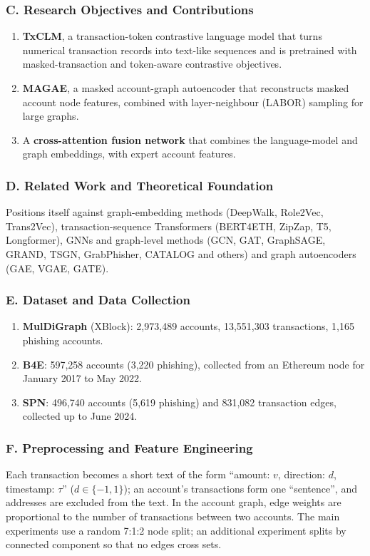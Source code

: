 \documentclass[11pt,a4paper]{article}
\begin{document}
\subsubsection*{C. Research Objectives and Contributions}
\begin{enumerate}[leftmargin=*]
    \item \textbf{TxCLM}, a transaction-token contrastive language model that turns numerical transaction records into text-like sequences and is pretrained with masked-transaction and token-aware contrastive objectives.
    \item \textbf{MAGAE}, a masked account-graph autoencoder that reconstructs masked account node features, combined with layer-neighbour (LABOR) sampling for large graphs.
    \item A \textbf{cross-attention fusion network} that combines the language-model and graph embeddings, with expert account features.
\end{enumerate}

\subsubsection*{D. Related Work and Theoretical Foundation}
Positions itself against graph-embedding methods (DeepWalk, Role2Vec, Trans2Vec), transaction-sequence Transformers (BERT4ETH, ZipZap, T5, Longformer), GNNs and graph-level methods (GCN, GAT, GraphSAGE, GRAND, TSGN, GrabPhisher, CATALOG and others) and graph autoencoders (GAE, VGAE, GATE).

\subsubsection*{E. Dataset and Data Collection}
\begin{enumerate}[leftmargin=*]
    \item \textbf{MulDiGraph} (XBlock): 2,973,489 accounts, 13,551,303 transactions, 1,165 phishing accounts.
    \item \textbf{B4E}: 597,258 accounts (3,220 phishing), collected from an Ethereum node for January 2017 to May 2022.
    \item \textbf{SPN}: 496,740 accounts (5,619 phishing) and 831,082 transaction edges, collected up to June 2024.
\end{enumerate}

\subsubsection*{F. Preprocessing and Feature Engineering}
Each transaction becomes a short text of the form ``amount: $v$, direction: $d$, timestamp: $\tau$'' ($d\in\{-1,1\}$); an account's transactions form one ``sentence'', and addresses are excluded from the text. In the account graph, edge weights are proportional to the number of transactions between two accounts. The main experiments use a random 7:1:2 node split; an additional experiment splits by connected component so that no edges cross sets.
\end{document}
